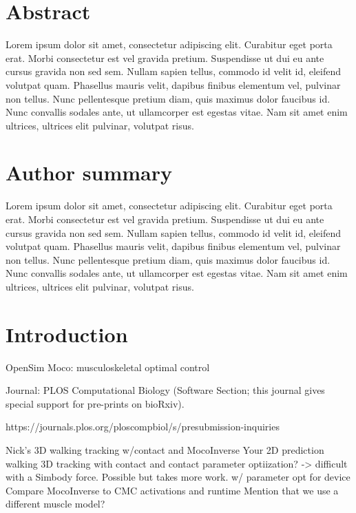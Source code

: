 \documentclass[10pt,letterpaper]{article}
\begin{document}
\section*{Abstract}
Lorem ipsum dolor sit amet, consectetur adipiscing elit. Curabitur eget porta erat. Morbi consectetur est vel gravida pretium. Suspendisse ut dui eu ante cursus gravida non sed sem. Nullam sapien tellus, commodo id velit id, eleifend volutpat quam. Phasellus mauris velit, dapibus finibus elementum vel, pulvinar non tellus. Nunc pellentesque pretium diam, quis maximus dolor faucibus id. Nunc convallis sodales ante, ut ullamcorper est egestas vitae. Nam sit amet enim ultrices, ultrices elit pulvinar, volutpat risus.


\section*{Author summary}
Lorem ipsum dolor sit amet, consectetur adipiscing elit. Curabitur eget porta erat. Morbi consectetur est vel gravida pretium. Suspendisse ut dui eu ante cursus gravida non sed sem. Nullam sapien tellus, commodo id velit id, eleifend volutpat quam. Phasellus mauris velit, dapibus finibus elementum vel, pulvinar non tellus. Nunc pellentesque pretium diam, quis maximus dolor faucibus id. Nunc convallis sodales ante, ut ullamcorper est egestas vitae. Nam sit amet enim ultrices, ultrices elit pulvinar, volutpat risus.

\linenumbers

\section*{Introduction}

OpenSim Moco: musculoskeletal optimal control

Journal: PLOS Computational Biology (Software Section; this journal gives special support for pre-prints on bioRxiv).

https://journals.plos.org/ploscompbiol/s/presubmission-inquiries


Nick’s 3D walking tracking w/contact and MocoInverse
Your 2D prediction walking
3D tracking with contact and contact parameter optiization?
		-> difficult with a Simbody force. Possible but takes more work.
w/ parameter opt for device
Compare MocoInverse to CMC activations and runtime
Mention that we use a different muscle model?
\end{document}
